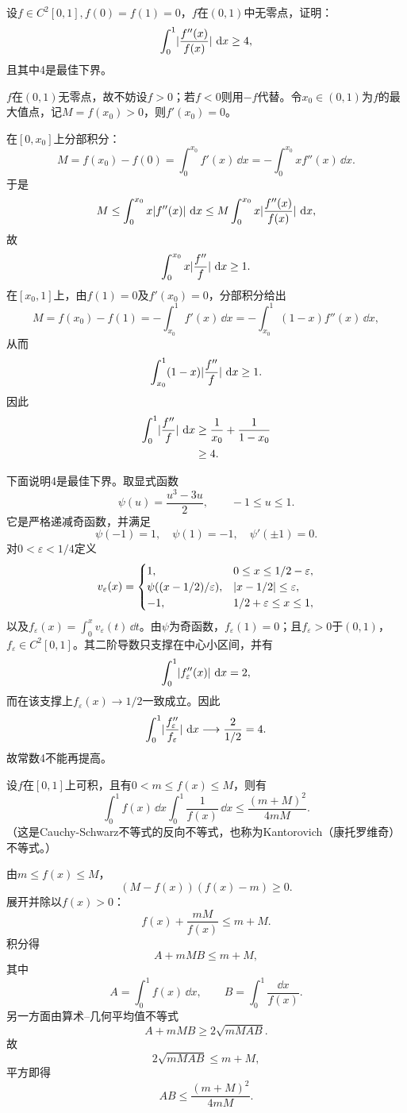 \begin{xreferenceproblem}[10]
设$f\in C^2[0,1],f(0)=f(1)=0$，$f$在$(0,1)$中无零点，证明：
  \[
    \int_0^1\lvert\frac{f''(x)}{f(x)}\rvert\,\mathop{}\!\mathrm{d} x\ge4,
  \]
  且其中4是最佳下界。
\end{xreferenceproblem}
\begin{xsolution}
$f$在$(0,1)$无零点，故不妨设$f>0$；若$f<0$则用$-f$代替。令$x_0\in(0,1)$为$f$的最大值点，记$M=f(x_0)>0$，则$f'(x_0)=0$。

在$[0,x_0]$上分部积分：
\[
 M=f(x_0)-f(0)=\int_0^{x_0}f'(x)\,\dd x
 =-\int_0^{x_0}x f''(x)\,\dd x.
\]
于是
\[
 M\le\int_0^{x_0}x\lvert f''(x)\rvert\,\mathop{}\!\mathrm{d} x
 \le M\int_0^{x_0}x\lvert\frac{f''(x)}{f(x)}\rvert\,\mathop{}\!\mathrm{d} x,
\]
故
\[
 \int_0^{x_0}x\lvert\frac{f''}{f}\rvert\,\mathop{}\!\mathrm{d} x\ge1.
\]
在$[x_0,1]$上，由$f(1)=0$及$f'(x_0)=0$，分部积分给出
\[
 M=f(x_0)-f(1)=-\int_{x_0}^1f'(x)\,\dd x
 =-\int_{x_0}^1(1-x)f''(x)\,\dd x,
\]
从而
\[
 \int_{x_0}^1(1-x)\lvert\frac{f''}{f}\rvert\,\mathop{}\!\mathrm{d} x\ge1.
\]
因此
\begin{align*}
\int_0^1\lvert\frac{f''}{f}\rvert\,\mathop{}\!\mathrm{d} x
&\ge\frac1{x_0}+\frac1{1-x_0}\\
&\ge4.
\end{align*}

下面说明4是最佳下界。取显式函数
\[
 \psi(u)=\frac{u^3-3u}{2},\qquad -1\le u\le1.
\]
它是严格递减奇函数，并满足
\[
 \psi(-1)=1,\quad \psi(1)=-1,\quad \psi'(\pm1)=0.
\]
对$0<\varepsilon<1/4$定义
\[
 v_\varepsilon(x)=
 \begin{cases}
 1,&0\le x\le1/2-\varepsilon,\\
 \psi((x-1/2)/\varepsilon),&\lvert x-1/2\rvert\le\varepsilon,\\
 -1,&1/2+\varepsilon\le x\le1,
 \end{cases}
\]
以及$f_\varepsilon(x)=\int_0^xv_\varepsilon(t)\,\dd t$。由$\psi$为奇函数，$f_\varepsilon(1)=0$；且$f_\varepsilon>0$于$(0,1)$，$f_\varepsilon\in C^2[0,1]$。其二阶导数只支撑在中心小区间，并有
\[
 \int_0^1\lvert f_\varepsilon''(x)\rvert\,\mathop{}\!\mathrm{d} x=2,
\]
而在该支撑上$f_\varepsilon(x)\to1/2$一致成立。因此
\[
 \int_0^1\lvert\frac{f_\varepsilon''}{f_\varepsilon}\rvert\,\mathop{}\!\mathrm{d} x
 \longrightarrow\frac{2}{1/2}=4.
\]
故常数4不能再提高。
\end{xsolution}


\begin{xreferenceproblem}[11]
设$f$在$[0,1]$上可积，且有$0<m\le f(x)\le M$，则有
  \[
    \int_0^1f(x)\,\dd x\int_0^1\frac1{f(x)}\,\dd x
    \le\frac{(m+M)^2}{4mM}.
  \]
  （这是Cauchy-Schwarz不等式的反向不等式，也称为Kantorovich（康托罗维奇）不等式。）
\end{xreferenceproblem}
\begin{xsolution}
由$m\le f(x)\le M$，
\[
 (M-f(x))(f(x)-m)\ge0.
\]
展开并除以$f(x)>0$：
\[
 f(x)+\frac{mM}{f(x)}\le m+M.
\]
积分得
\[
 A+mMB\le m+M,
\]
其中
\[
 A=\int_0^1f(x)\,\dd x,
 \qquad B=\int_0^1\frac{\dd x}{f(x)}.
\]
另一方面由算术--几何平均值不等式
\[
 A+mMB\ge2\sqrt{mMAB}.
\]
故
\[
 2\sqrt{mMAB}\le m+M,
\]
平方即得
\[
 \boxed{AB\le\frac{(m+M)^2}{4mM}}.
\]
\end{xsolution}


